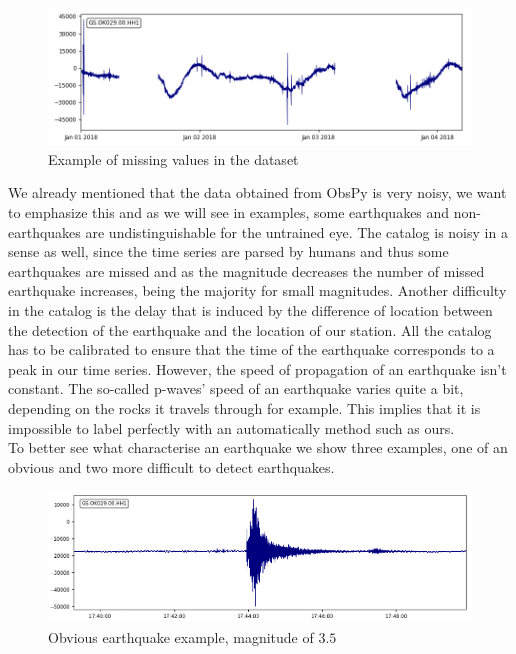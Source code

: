 \documentclass[10pt,conference,compsocconf]{IEEEtran}
\begin{document}
\begin{figure}[h]
  \centering
	\includegraphics[width=\columnwidth]{hole_example.png}
  \caption{Example of missing values in the dataset}
	\label{fig:10min-example}
\end{figure}

We already mentioned that the data obtained from ObsPy is very noisy, we want to emphasize this and as we will see in examples, some earthquakes and non-earthquakes are undistinguishable for the untrained eye. The catalog is noisy in a sense as well, since the time series are parsed by humans and thus some earthquakes are missed and as the magnitude decreases the number of missed earthquake increases, being the majority for small magnitudes. Another difficulty in the catalog is the delay that is induced by the difference of location between the detection of the earthquake and the location of our station. All the catalog has to be calibrated to ensure that the time of the earthquake corresponds to a peak in our time series. However, the speed of propagation of an earthquake isn't constant. The so-called p-waves' speed of an earthquake varies quite a bit, depending on the rocks it travels through for example. This implies that it is impossible to label perfectly with an automatically method such as ours.\\
To better see what characterise an earthquake we show three examples, one of an obvious and two more difficult to detect earthquakes.

\begin{figure}[h]
  \centering
	\includegraphics[width=\columnwidth]{fat-earthquake-example.png}
  \caption{Obvious earthquake example, magnitude of $3.5$}
	\label{fig:obvious}
\end{figure}
\end{document}
